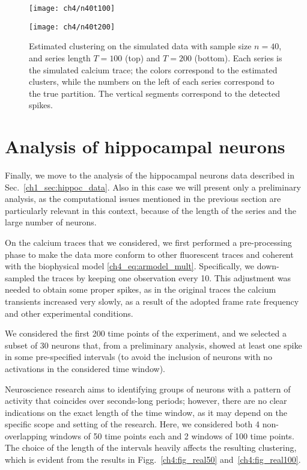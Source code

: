 \begin{figure}
	\centering
	\texttt{[image: ch4/n40t100]}\\
	\centerline{
	\texttt{[image: ch4/n40t200]}
}
	\label{ch4:fig_n40}
	\caption[Estimated clustering on the simulated data with sample size $n=40$.]{Estimated clustering on the simulated data with sample size $n=40$, and series length $T=100$ (top) and $T=200$ (bottom). Each series is the simulated calcium trace; the colors correspond to the estimated clusters, while the numbers on the left of each series correspond to the true partition. The vertical segments correspond to the detected spikes.}
\end{figure}





\section{Analysis of hippocampal neurons}
Finally, we move to the analysis of the hippocampal neurons data described in Sec.~\ref{ch1_sec:hippoc_data}. 
Also in this case we will present only a preliminary analysis, as the computational issues mentioned in the previous section are particularly relevant in this context, because of the length of the series and the large number of neurons. 

On the calcium traces that we considered, we first performed a pre-processing phase to make the data more conform to other fluorescent traces and coherent with the biophysical model \ref{ch4_eq:armodel_mult}. Specifically, we down-sampled the traces by keeping one observation every 10. This adjustment was needed to obtain some proper spikes, as in the original traces the calcium transients increased very slowly, as a result of the adopted frame rate frequency and other experimental conditions.

We considered the first 200 time points of the experiment, and we selected a subset of 30 neurons that, from a preliminary analysis, showed at least one spike in some pre-specified intervals (to avoid the inclusion of neurons with no activations in the considered time window).

Neuroscience research aims to identifying groups of neurons with a pattern of activity that coincides over seconds-long periods; however, there are no clear indications on the exact length of the time window, as it may depend on the specific scope and setting of the research. Here, we considered both 4 non-overlapping windows of 50 time points each and 2 windows of 100 time points. The choice of the length of the intervals heavily affects the resulting clustering, which is evident from the results in Figg.~\ref{ch4:fig_real50} and~\ref{ch4:fig_real100}.


